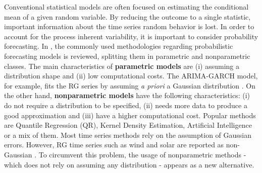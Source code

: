 
Conventional statistical models are often focused on estimating the conditional mean of a given random variable. %
By reducing the outcome to a single statistic, important information about the time series random behavior is lost. In order to account for the process inherent variability, it is important to consider probability forecasting.
In \cite{zhang_review_2014}, the commonly used methodologies regarding probabilistic forecasting models is reviewed, splitting them in parametric and nonparametric classes. The main characteristics of \textbf{parametric models} are (i) assuming a distribution shape and (ii) low computational costs. The ARIMA-GARCH model, for example, fits the RG series by assuming \textit{a priori} a Gaussian distribution . On the other hand, \textbf{nonparametric models} have the following characteristics: (i) do not require a distribution to be specified, (ii) needs more data to produce a good approximation and (iii) have a higher computational cost. Popular methods are Quantile Regression (QR), Kernel Density Estimation,  Artificial Intelligence or a mix of them.
Most time series methods rely on the assumption of Gaussian errors. However, RG time series such as wind and solar are reported as non-Gaussian \cite{bessa2012time,jeon2012using,taylor2015forecasting,Wan2017}. To circumvent this problem, the usage of nonparametric methods - which does not rely on assuming any distribution - appears as a new alternative. 

